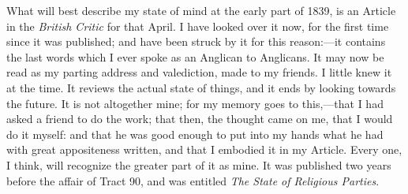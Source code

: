 What will best describe my state of mind at the early part of 1839,
is an Article in the \emph{British Critic} for that April. I have looked over
it now, for the first time since it was published; and have been struck
by it for this reason:—it contains the last words which I ever spoke as
an Anglican to Anglicans. It may now be read as my parting address and
valediction, made to my friends. I little knew it at the time. It
reviews the actual state of things, and it ends by looking towards the
future. It is not altogether mine; for my memory goes to this,—that I
had asked a friend to do the work; that then, the thought came on me,
that I would do it myself: and that he was good enough to put into my
hands what he had with great appositeness written, and that I
embodied it in my Article. Every one, I think, will recognize the
greater part of it as mine. It was published two years before the affair
of Tract 90, and was entitled \emph{The State of Religious Parties}.

